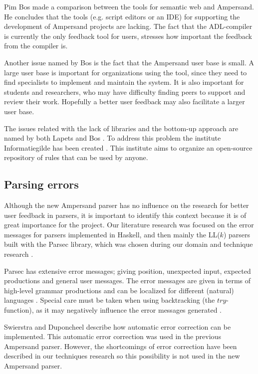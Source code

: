 Pim Bos  made a comparison between the tools for semantic web and Ampersand.
He concludes that the tools (e.g. script editors or an IDE) for supporting the development of Ampersand projects are lacking.
The fact that the ADL-compiler is currently the only feedback tool for users, stresses how important the feedback from the compiler is.

Another issue named by Bos is the fact that the Ampersand user base is small.
A large user base is important for organizations using the tool, since they need to find specialists to implement and maintain the system.
It is also important for students and researchers, who may have difficulty finding peers to support and review their work.
Hopefully a better user feedback may also facilitate a larger user base.

The issues related with the lack of libraries and the bottom-up approach are named by both Lapets  and Bos .
To address this problem the institute Informatiegilde has been created .
This institute aims to organize an open-source repository of rules that can be used by anyone.

\subsection{Parsing errors}
Although the new Ampersand parser has no influence on the research for better user feedback in parsers, it is important to identify this context because it is of great importance for the project.
Our literature research was focused on the error messages for parsers implemented in Haskell, and then mainly the LL($k$) parsers built with the Parsec library, which was chosen during our domain and technique research .

Parsec has extensive error messages; giving position, unexpected input, expected productions and general user messages.
The error messages are given in terms of high-level grammar productions and can be localized for different (natural) languages .
Special care must be taken when using backtracking (the $try$-function), as it may negatively influence the error messages generated .

Swierstra and Duponcheel  describe how automatic error correction can be implemented.
This automatic error correction was used in the previous Ampersand parser.
However, the shortcomings of error correction have been described in our techniques research \cite{parsing} so this possibility is not used in the new Ampersand parser.











